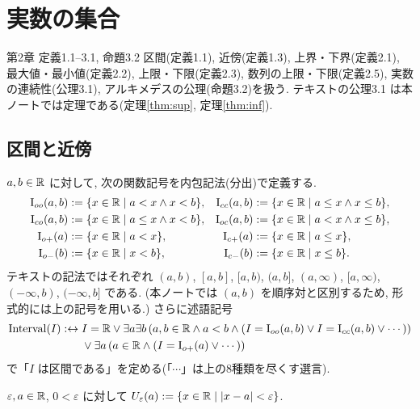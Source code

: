 \chapter{実数の集合}\label{ch:text2}

\begin{textref}{第2章 定義1.1--3.1, 命題3.2}
  区間(定義1.1), 近傍(定義1.3), 上界・下界(定義2.1), 最大値・最小値(定義2.2), 上限・下限(定義2.3), 数列の上限・下限(定義2.5), 実数の連続性(公理3.1), アルキメデスの公理(命題3.2)を扱う. テキストの公理3.1 は本ノートでは定理である(定理\ref{thm:sup}, 定理\ref{thm:inf}).
\end{textref}

\section{区間と近傍}

\begin{dfn}[テキスト定義1.1]\label{dfn:interval}
  $a, b \in \mathbb{R}$ に対して, 次の関数記号を内包記法(分出)で定義する.
  \begin{align*}
    \mathrm{I}_{oo}(a,b) &:= \{x \in \mathbb{R} \mid a < x \land x < b\}, & \mathrm{I}_{cc}(a,b) &:= \{x \in \mathbb{R} \mid a \leq x \land x \leq b\},\\
    \mathrm{I}_{co}(a,b) &:= \{x \in \mathbb{R} \mid a \leq x \land x < b\}, & \mathrm{I}_{oc}(a,b) &:= \{x \in \mathbb{R} \mid a < x \land x \leq b\},\\
    \mathrm{I}_{o+}(a) &:= \{x \in \mathbb{R} \mid a < x\}, & \mathrm{I}_{c+}(a) &:= \{x \in \mathbb{R} \mid a \leq x\},\\
    \mathrm{I}_{o-}(b) &:= \{x \in \mathbb{R} \mid x < b\}, & \mathrm{I}_{c-}(b) &:= \{x \in \mathbb{R} \mid x \leq b\}.
  \end{align*}
  テキストの記法ではそれぞれ $(a,b)$, $[a,b]$, $[a,b)$, $(a,b]$, $(a,\infty)$, $[a,\infty)$, $(-\infty,b)$, $(-\infty,b]$ である. (本ノートでは $(a,b)$ を順序対と区別するため, 形式的には上の記号を用いる.) さらに述語記号
  \begin{align*}
    \mathrm{Interval}(I) :\leftrightarrow{}& I = \mathbb{R} \lor \exists a\exists b\,(a,b \in \mathbb{R} \land a < b \land (I = \mathrm{I}_{oo}(a,b) \lor I = \mathrm{I}_{cc}(a,b) \lor \cdots)) \\
    & \lor \exists a\,(a \in \mathbb{R} \land (I = \mathrm{I}_{o+}(a) \lor \cdots))
  \end{align*}
  で「$I$ は区間である」を定める(「$\cdots$」は上の8種類を尽くす選言).
\end{dfn}

\begin{dfn}[近傍. テキスト定義1.3]
  $\varepsilon, a \in \mathbb{R}$, $0 < \varepsilon$ に対して $U_\varepsilon(a) := \{x \in \mathbb{R} \mid \lvert x - a\rvert < \varepsilon\}$.
\end{dfn}


